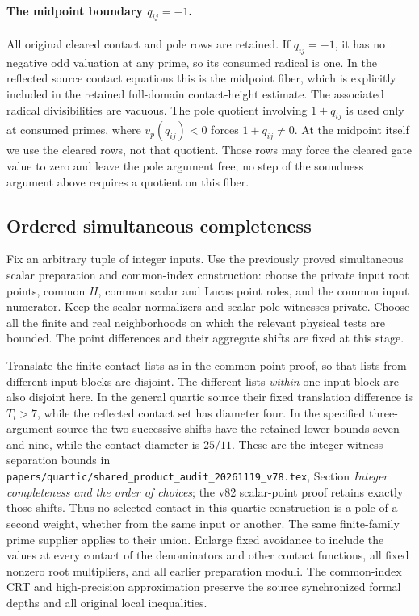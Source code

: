 \documentclass[11pt]{article}
\begin{document}
\paragraph{The midpoint boundary \(q_{ij}=-1\).}
All original cleared contact and pole rows are
retained. If \(q_{ij}=-1\), it has no negative
odd valuation at any prime, so its consumed
radical is one. In the reflected source
contact equations this is the midpoint fiber,
which is explicitly included in the retained
full-domain contact-height estimate. The
associated radical divisibilities are vacuous.
The pole quotient involving \(1+q_{ij}\) is
used only at consumed primes, where
\(v_p(q_{ij})<0\) forces \(1+q_{ij}\ne0\).
At the midpoint itself we use the cleared
rows, not that quotient. Those rows may
force the cleared gate value to zero and
leave the pole argument free; no step of
the soundness argument above requires a
quotient on this fiber.

\subsection{Ordered simultaneous completeness}

Fix an arbitrary tuple of integer inputs.
Use the previously proved simultaneous scalar
preparation and common-index construction:
choose the private input root points, common
\(H\), common scalar and Lucas point roles,
and the common input numerator. Keep the
scalar normalizers and scalar-pole witnesses
private. Choose all the finite and real
neighborhoods on which the relevant physical
tests are bounded. The point differences
and their aggregate shifts are fixed at
this stage.

Translate the finite contact lists as in
the common-point proof, so that lists from
different input blocks are disjoint.
The different lists \emph{within} one input
block are also disjoint here. In the general
quartic source their fixed translation
difference is \(T_i>7\), while the reflected
contact set has diameter four. In the
specified three-argument source the two
successive shifts have the retained lower
bounds seven and nine, while the contact
diameter is \(25/11\). These are the
integer-witness separation bounds in
\nolinkurl{papers/quartic/shared_product_audit_20261119_v78.tex},
Section \emph{Integer completeness and the
order of choices}; the v82 scalar-point
proof retains exactly those shifts.
Thus no selected contact in this quartic
construction is a pole of a second weight,
whether from the same input or another.
The same finite-family prime supplier
applies to their union. Enlarge fixed
avoidance to include the values at every
contact of the denominators and other
contact functions, all fixed nonzero
root multipliers, and all earlier
preparation moduli. The common-index
CRT and high-precision approximation
preserve the source synchronized formal
depths and all original local inequalities.
\end{document}
